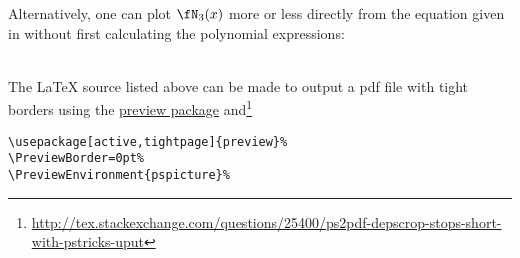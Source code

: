 \begin{minipage}{\tw-65mm}
Alternatively, one can plot $\fN_3(x)$ more or less directly from 
the equation given in 
without first calculating the polynomial expressions:
\end{minipage}\hfill{}%
\\


The {\LaTeX} source listed above can be made to output a pdf file
with tight borders using the \href{http://www.ctan.org/pkg/preview}{preview package} and\footnote{
\url{http://tex.stackexchange.com/questions/25400/ps2pdf-depscrop-stops-short-with-pstricks-uput}}
\begin{lstlisting}
\usepackage[active,tightpage]{preview}%
\PreviewBorder=0pt%
\PreviewEnvironment{pspicture}%
\end{lstlisting}

%


